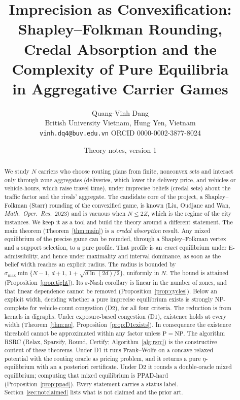 \documentclass[11pt]{article}
\title{Imprecision as Convexification:\\
Shapley--Folkman Rounding, Credal Absorption and the Complexity of Pure Equilibria\\
in Aggregative Carrier Games}
\author{Quang-Vinh Dang\\ British University Vietnam, Hung Yen, Vietnam\\ \texttt{vinh.dq4@buv.edu.vn} \quad ORCID 0000-0002-3877-8024}
\date{Theory notes, version 1}
\theoremstyle{definition}
\theoremstyle{remark}
\begin{document}
\maketitle

\begin{abstract}
We study $N$ carriers who choose routing plans from finite, nonconvex sets and interact only through zone aggregates (deliveries, which lower the delivery price, and vehicles or vehicle-hours, which raise travel time), under imprecise beliefs (credal sets) about the traffic factor and the rivals' aggregate. The candidate core of the project, a Shapley--Folkman (Starr) rounding of the convexified game, is known (Liu, Oudjane and Wan, \emph{Math.\ Oper.\ Res.}\ 2023) and is vacuous when $N\le 2Z$, which is the regime of the city instances. We keep it as a tool and build the theory around a different statement. The main theorem (Theorem~\ref{thm:main}) is a \emph{credal absorption} result. Any mixed equilibrium of the precise game can be rounded, through a Shapley--Folkman vertex and a support selection, to a pure profile. That profile is an \emph{exact} equilibrium under E-admissibility, and hence under maximality and interval dominance, as soon as the belief width reaches an explicit radius. The radius is bounded by $\sigma_{\max}\min\{N-1,\,d+1,\,1+\sqrt{d\ln(2d)/2}\}$, uniformly in $N$. The bound is attained (Proposition~\ref{prop:tight}). Its $\varepsilon$-Nash corollary is linear in the number of zones, and that linear dependence cannot be removed (Proposition~\ref{prop:cycles}). Below an explicit width, deciding whether a pure imprecise equilibrium exists is strongly NP-complete for vehicle-count congestion (D2), for all four criteria. The reduction is from kernels in digraphs. Under exposure-based congestion (D1), existence holds at every width (Theorem~\ref{thm:np}, Proposition~\ref{prop:D1exists}). In consequence the existence threshold cannot be approximated within any factor unless $\mathrm{P}=\mathrm{NP}$. The algorithm RSRC (Relax, Sparsify, Round, Certify; Algorithm~\ref{alg:rsrc}) is the constructive content of these theorems. Under D1 it runs Frank--Wolfe on a concave relaxed potential with the routing oracle as pricing problem, and it returns a pure $\eta$-equilibrium with an a posteriori certificate. Under D2 it rounds a double-oracle mixed equilibrium; computing that mixed equilibrium is PPAD-hard (Proposition~\ref{prop:ppad}). Every statement carries a status label. Section~\ref{sec:notclaimed} lists what is not claimed and the prior art.
\end{abstract}
\end{document}
